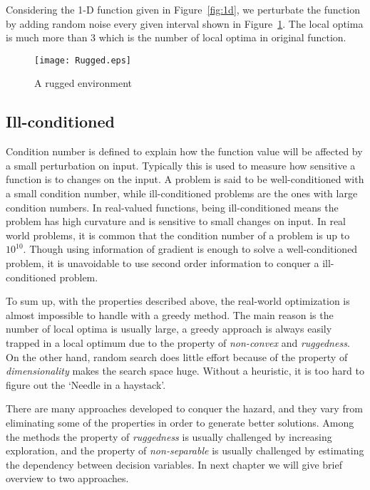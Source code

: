 Considering the 1-D function given in Figure~\ref{fig:1d}, we
perturbate the function by adding random noise every given interval
shown in Figure~\ref{fig:rugged}.
The local optima is much more than 3 which is the number of local optima
in original function.

\begin{figure}[h]
  \centering
  \texttt{[image: Rugged.eps]}
  \caption{A rugged environment}
  \label{fig:rugged}
\end{figure}

\subsection{Ill-conditioned}

Condition number is defined to explain how the function value will be
affected by a small perturbation on input.
Typically this is used to measure how sensitive a function is to changes
on the input.
A problem is said to be well-conditioned with a small condition number,
while ill-conditioned problems are the ones with large
condition numbers.
In real-valued functions, being ill-conditioned means the problem has
high curvature and is sensitive to small changes on input.
In real world problems, it is common that the condition number of a
problem is up to $10^{10}$.
Though using information of gradient is enough to solve a
well-conditioned problem, it is unavoidable to use second order
information to conquer a ill-conditioned problem.



To sum up, with the properties described above, the real-world
optimization is almost impossible to handle with a greedy method.
The main reason is the number of local optima is usually large, a greedy
approach is always easily trapped in a local optimum due to the property
of \emph{non-convex} and \emph{ruggedness}.
On the other hand, random search does little effort because of the
property of \emph{dimensionality} makes the search space huge.
Without a heuristic, it is too hard to figure out the `Needle in a
haystack'.

There are many approaches developed to conquer the hazard, and they vary
from eliminating some of the properties in order to generate better
solutions.
Among the methods the property of \emph{ruggedness} is usually
challenged by increasing exploration, and the property of
\emph{non-separable} is usually challenged by estimating the dependency
between decision variables.
In next chapter we will give brief overview to two approaches.
